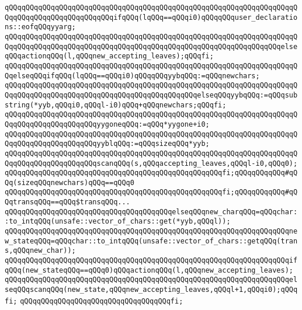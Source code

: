 \verb|qQQqqQQqqQQqqQQqqQQqqQQqqQQqqQQqqQQqqQQqqQQqqQQqqQQqqQQqqQQqqQQqqQQqqQQqqQQqqQQqqQQqqQQqqQQqqQQqifqQQq(lqQQq==qQQqi0)qQQqqQQquser_declarations::eofqQQqyyarg;|\newline
\verb|qQQqqQQqqQQqqQQqqQQqqQQqqQQqqQQqqQQqqQQqqQQqqQQqqQQqqQQqqQQqqQQqqQQqqQQqqQQqqQQqqQQqqQQqqQQqqQQqqQQqqQQqqQQqqQQqqQQqqQQqqQQqqQQqqQQqqQQqelseqQQqactionqQQq(l,qQQqnew_accepting_leaves);qQQqfi;|\newline
\verb|qQQqqQQqqQQqqQQqqQQqqQQqqQQqqQQqqQQqqQQqqQQqqQQqqQQqqQQqqQQqqQQqqQQqqQQqelseqQQqifqQQq(lqQQq==qQQqi0)qQQqqQQqyybqQQq:=qQQqnewchars;|\newline
\verb|qQQqqQQqqQQqqQQqqQQqqQQqqQQqqQQqqQQqqQQqqQQqqQQqqQQqqQQqqQQqqQQqqQQqqQQqqQQqqQQqqQQqqQQqqQQqqQQqqQQqqQQqqQQqqQQqqQQqelseqQQqyybqQQq:=qQQqsubstring(*yyb,qQQqi0,qQQql-i0)qQQq+qQQqnewchars;qQQqfi;|\newline
\verb|qQQqqQQqqQQqqQQqqQQqqQQqqQQqqQQqqQQqqQQqqQQqqQQqqQQqqQQqqQQqqQQqqQQqqQQqqQQqqQQqqQQqqQQqqQQqyygoneqQQq:=qQQq*yygone+i0;|\newline
\verb|qQQqqQQqqQQqqQQqqQQqqQQqqQQqqQQqqQQqqQQqqQQqqQQqqQQqqQQqqQQqqQQqqQQqqQQqqQQqqQQqqQQqqQQqqQQqyyblqQQq:=qQQqsizeqQQq*yyb;|\newline
\verb|qQQqqQQqqQQqqQQqqQQqqQQqqQQqqQQqqQQqqQQqqQQqqQQqqQQqqQQqqQQqqQQqqQQqqQQqqQQqqQQqqQQqqQQqqQQqscanqQQq(s,qQQqaccepting_leaves,qQQql-i0,qQQq0);|\newline
\verb|qQQqqQQqqQQqqQQqqQQqqQQqqQQqqQQqqQQqqQQqqQQqqQQqqQQqfi;qQQqqQQqqQQq#qQQq(sizeqQQqnewchars)qQQq==qQQq0|\newline
\verb|qQQqqQQqqQQqqQQqqQQqqQQqqQQqqQQqqQQqqQQqqQQqqQQqqQQqfi;qQQqqQQqqQQq#qQQqtransqQQq==qQQq$transqQQq...|\newline
\verb|qQQqqQQqqQQqqQQqqQQqqQQqqQQqqQQqqQQqqQQqelseqQQqnew_charqQQq=qQQqchar::to_intqQQq(unsafe::vector_of_chars::get(*yyb,qQQql));|\newline
\verb|qQQqqQQqqQQqqQQqqQQqqQQqqQQqqQQqqQQqqQQqqQQqqQQqqQQqqQQqqQQqqQQqqQQqnew_stateqQQq=qQQqchar::to_intqQQq(unsafe::vector_of_chars::getqQQq(trans,qQQqnew_char));|\newline
\verb|qQQqqQQqqQQqqQQqqQQqqQQqqQQqqQQqqQQqqQQqqQQqqQQqqQQqqQQqqQQqqQQqqQQqifqQQq(new_stateqQQq==qQQq0)qQQqactionqQQq(l,qQQqnew_accepting_leaves);|\newline
\verb|qQQqqQQqqQQqqQQqqQQqqQQqqQQqqQQqqQQqqQQqqQQqqQQqqQQqqQQqqQQqqQQqqQQqelseqQQqscanqQQq(new_state,qQQqnew_accepting_leaves,qQQql+1,qQQqi0);qQQqfi;|\newline
\verb|qQQqqQQqqQQqqQQqqQQqqQQqqQQqqQQqqQQqfi;|\newline
